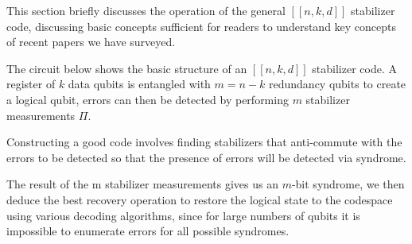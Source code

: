
This section briefly discusses the operation of the general $[[n, k, d]]$ stabilizer code, discussing basic concepts sufficient for readers to understand key concepts of recent papers we have surveyed.

The circuit below shows the basic structure of an $[[n,k,d]]$ stabilizer code. A register of $k$ data qubits is entangled with $m = n - k$ redundancy qubits to create a logical qubit, errors can then be detected by performing $m$ stabilizer measurements $\Pi$.

Constructing a good code involves finding stabilizers that anti-commute with the errors to be detected so that the presence of errors will be detected via syndrome.

The result of the m stabilizer measurements gives us an $m$-bit syndrome, we then deduce the best recovery operation to restore the logical state to the codespace using various decoding algorithms, since for large numbers of qubits it is impossible to enumerate errors for all possible syndromes.

